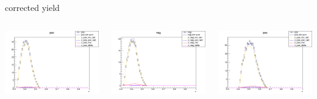 \begin{frame}{corrected yield}
\begin{columns}
\begin{column}[T]{0.25\textwidth}
\includegraphics[width = \textwidth]{results/yield/statistics_corr/yield_x_Q2_z_0.45_3.898_0.40_pos.png}
\end{column}
\begin{column}[T]{0.25\textwidth}
\includegraphics[width = \textwidth]{results/yield/statistics_corr/yield_x_Q2_z_0.45_3.898_0.40_neg.png}
\end{column}
\begin{column}[T]{0.25\textwidth}
\includegraphics[width = \textwidth]{results/yield/statistics_corr/yield_x_Q2_z_0.45_3.898_0.50_pos.png}

\end{column}
\end{columns}
\end{frame}
